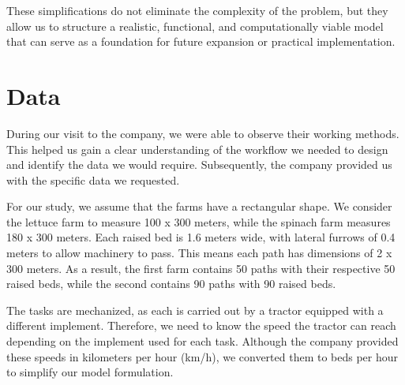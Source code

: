 These simplifications do not eliminate the complexity of the problem, but they allow us to structure a realistic, functional, and computationally viable model that can serve as a foundation for future expansion or practical implementation.


\chapter*{Data}
During our visit to the company, we were able to observe their working methods. This helped us gain a clear understanding of the workflow we needed to design  
and identify the data we would require. Subsequently, the company provided us with the specific data we requested.

For our study, we assume that the farms have a rectangular shape. We consider the lettuce farm to measure 100 x 300 meters,  
while the spinach farm measures 180 x 300 meters. Each raised bed is 1.6 meters wide, with lateral furrows of 0.4 meters to allow machinery to pass.  
This means each path has dimensions of 2 x 300 meters.  
As a result, the first farm contains 50 paths with their respective 50 raised beds, while the second contains 90 paths with 90 raised beds.

The tasks are mechanized, as each is carried out by a tractor equipped with a different implement.  
Therefore, we need to know the speed the tractor can reach depending on the implement used for each task.  
Although the company provided these speeds in kilometers per hour (km/h), we converted them to beds per hour to simplify our model formulation.

